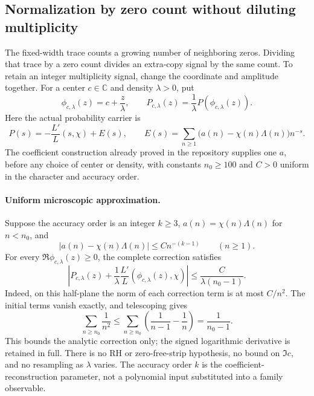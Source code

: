 \subsection{Normalization by zero count without diluting multiplicity}
\label{sec:zero-count-normalization}

The fixed-width trace counts a growing number of neighboring zeros.
Dividing that trace by a zero count divides an extra-copy signal by the
same count.  To retain an integer multiplicity signal, change the
coordinate and amplitude together.  For a center \(c\in\mathbb C\)
and density \(\lambda>0\), put
\begin{equation}
 \phi_{c,\lambda}(z)=c+\frac z\lambda,
 \qquad
 P_{c,\lambda}(z)=\frac1\lambda P(\phi_{c,\lambda}(z)).
 \label{eq:count-normalized-carrier}
\end{equation}
Here the actual probability carrier is
\[
 P(s)=-\frac{L'}{L}(s,\chi)+E(s),\qquad
 E(s)=\sum_{n\ge1}\bigl(a(n)-\chi(n)\Lambda(n)\bigr)n^{-s}.
\]
The coefficient construction already proved in the repository supplies
one \(a\), before any choice of center or density, with constants
\(n_0\ge100\) and \(C>0\) uniform in the character and accuracy order.

\paragraph{Uniform microscopic approximation.}
Suppose the accuracy order is an integer \(k\ge3\),
\(a(n)=\chi(n)\Lambda(n)\) for \(n<n_0\), and
\[
 |a(n)-\chi(n)\Lambda(n)|\le Cn^{-(k-1)}\qquad(n\ge1).
\]
For every \(\Re\phi_{c,\lambda}(z)\ge0\), the complete correction satisfies
\begin{equation}
 \left|P_{c,\lambda}(z)+\frac1\lambda
       \frac{L'}{L}(\phi_{c,\lambda}(z),\chi)\right|
 \le \frac{C}{\lambda(n_0-1)}.
 \label{eq:count-normalized-error}
\end{equation}
Indeed, on this half-plane the norm of each correction term is at most
\(C/n^2\).  The initial terms vanish exactly, and telescoping gives
\[
 \sum_{n\ge n_0}\frac1{n^2}
 \le\sum_{n\ge n_0}\left(\frac1{n-1}-\frac1n\right)
 =\frac1{n_0-1}.
\]
This bounds the analytic correction only; the signed logarithmic
derivative is retained in full.  There is no RH or zero-free-strip
hypothesis, no bound on \(\Im c\), and no resampling as \(\lambda\) varies.
The accuracy order \(k\) is the coefficient-reconstruction parameter,
not a polynomial input substituted into a family observable.

